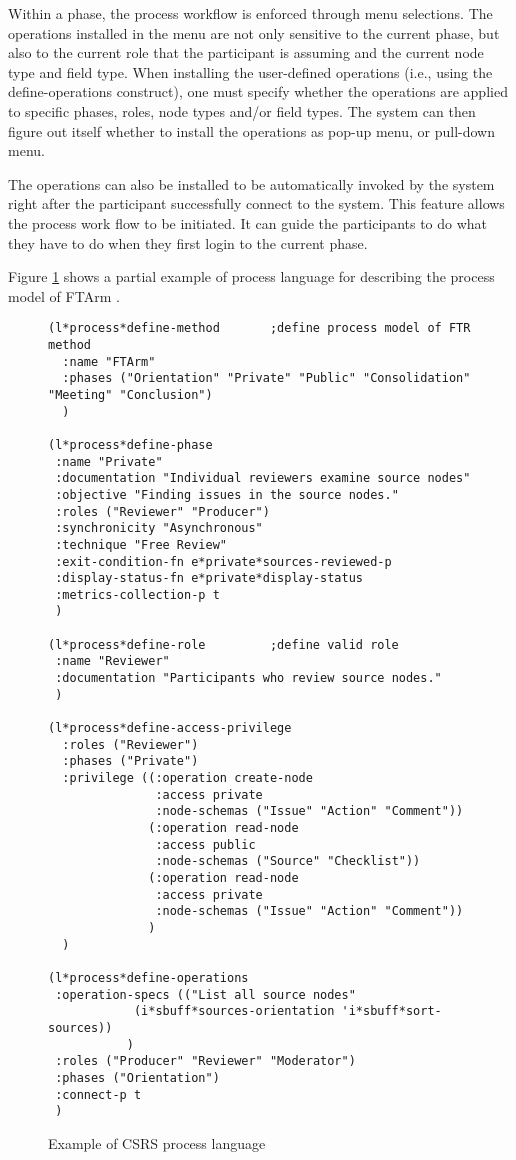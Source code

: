 Within a phase, the process workflow is enforced through menu
selections. The operations installed in the menu are
not only sensitive to the current phase, but also to the current role that
the participant is assuming and the current node type and field type.
When installing the user-defined operations (i.e., using the
define-operations construct), one must specify
whether the operations are applied to specific 
phases, roles, node types and/or field types. The system can then
figure out itself whether to install the operations as pop-up menu,
or pull-down menu.

The operations can also be installed to be automatically invoked by the
system right after the participant successfully connect to the system.
This feature allows the process work flow to be initiated. It can
guide the participants to do what they have to do when they first login
to the current phase.

Figure \ref{fig:process-language} shows a partial  example of process
language for describing the process model of FTArm
\cite{Johnson93,CSDL-93-17}.   


\begin{figure}[tp]
  \footnotesize
  \begin{verbatim}
(l*process*define-method       ;define process model of FTR method
  :name "FTArm"                
  :phases ("Orientation" "Private" "Public" "Consolidation" "Meeting" "Conclusion")
  )

(l*process*define-phase
 :name "Private"
 :documentation "Individual reviewers examine source nodes"
 :objective "Finding issues in the source nodes."
 :roles ("Reviewer" "Producer")
 :synchronicity "Asynchronous"
 :technique "Free Review"
 :exit-condition-fn e*private*sources-reviewed-p
 :display-status-fn e*private*display-status
 :metrics-collection-p t
 )

(l*process*define-role         ;define valid role
 :name "Reviewer"
 :documentation "Participants who review source nodes."
 )

(l*process*define-access-privilege 
  :roles ("Reviewer")
  :phases ("Private")
  :privilege ((:operation create-node 
               :access private 
               :node-schemas ("Issue" "Action" "Comment"))
              (:operation read-node 
               :access public 
               :node-schemas ("Source" "Checklist"))
              (:operation read-node
               :access private
               :node-schemas ("Issue" "Action" "Comment"))
              )
  )

(l*process*define-operations
 :operation-specs (("List all source nodes" 
		    (i*sbuff*sources-orientation 'i*sbuff*sort-sources))
		   )
 :roles ("Producer" "Reviewer" "Moderator")
 :phases ("Orientation")
 :connect-p t
 )

  \end{verbatim}
  \normalsize
  \caption{Example of CSRS process language}
  \label{fig:process-language}
\end{figure}


